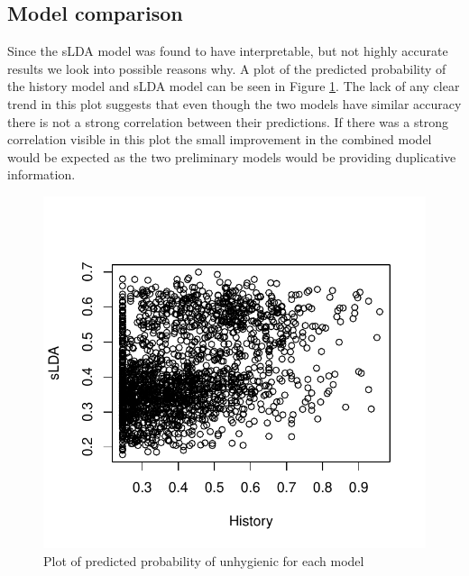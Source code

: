 \documentclass{article}
\begin{document}
\subsection{Model comparison}
Since the sLDA model was found to have interpretable, but not highly accurate results we look into possible reasons why. A 
plot of the predicted probability of the history model and sLDA model can be seen in Figure \ref{correlation}. The lack of any clear trend in this plot suggests that even though the two models have similar accuracy there is not a strong correlation between their predictions. If there was a strong correlation visible in this plot the small improvement in the combined model would be expected as the two preliminary models would be providing duplicative information.

\begin{figure}[h!]
\centering
\includegraphics[scale = 0.75]{prediction_correlation}
\caption{Plot of predicted probability of unhygienic for each model}
\label{correlation}
\end{figure}
\end{document}

